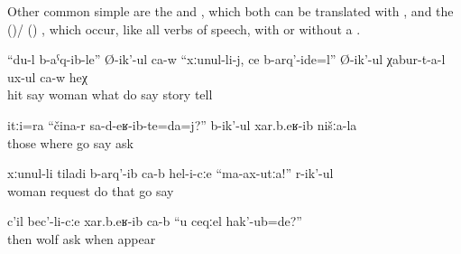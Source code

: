 Other common simple  are the   and , which both can be translated with , and the   ()\slash{} () , which occur, like all verbs of speech, with or without a  .
%
\begin{exe}
	\ex	\label{ex:I hit my wife, what should I do, he says, he is telling the stories}
	\gll	``du-l	b-aˁq-ib-le''	Ø-ik'-ul	ca-w	``xːunul-li-j,	ce	b-arq'-ide=l''	Ø-ik'-ul	χabur-t-a-l	ux-ul	ca-w	heχ\\
			hit	say		woman	what	do	say	story	tell			\\
	\glt	{}

	\ex	\label{ex:They asked us, where did you come from}
	\gll	itːi=ra	``čina-r	sa-d-eʁ-ib-te=da=j?''	b-ik'-ul	xar.b.eʁ-ib	nišːa-la\\
		those	where	go	say	ask	\\
	\glt	{}

	\ex	\label{ex:‎His wife begged him, Do not go}
	\gll	xːunul-li	tiladi	b-arq'-ib	ca-b	hel-i-cːe	``ma-ax-utːa!''	r-ik'-ul\\
		woman	request	do		that	go	say\\
	\glt	{}
	
	\ex	\label{ex:‎‎Then they asked the wolf, When were you born?}
	\gll	c'il	bec'-li-cːe	xar.b.eʁ-ib	ca-b	``u	ceqːel	hak'-ub=de?''\\
		then	wolf	ask			when	appear\\
	\glt	{}
	
\end{exe}

